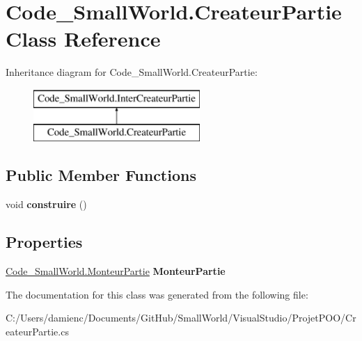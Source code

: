 \hypertarget{class_code___small_world_1_1_createur_partie}{\section{Code\-\_\-\-Small\-World.\-Createur\-Partie Class Reference}
\label{class_code___small_world_1_1_createur_partie}
}
Inheritance diagram for Code\-\_\-\-Small\-World.\-Createur\-Partie\-:\begin{figure}[H]
\begin{center}
\leavevmode
\includegraphics[height=2.000000cm]{class_code___small_world_1_1_createur_partie}
\end{center}
\end{figure}
\subsection*{Public Member Functions}
\begin{DoxyCompactItemize}
\item 
\hypertarget{class_code___small_world_1_1_createur_partie_a3836d8cd285e4cc0686d693dd91c18a5}{void {\bfseries construire} ()}\label{class_code___small_world_1_1_createur_partie_a3836d8cd285e4cc0686d693dd91c18a5}

\end{DoxyCompactItemize}
\subsection*{Properties}
\begin{DoxyCompactItemize}
\item 
\hypertarget{class_code___small_world_1_1_createur_partie_a3d566654338c6f3d15b65cc128424f88}{\hyperlink{class_code___small_world_1_1_monteur_partie}{Code\-\_\-\-Small\-World.\-Monteur\-Partie} {\bfseries Monteur\-Partie}}\label{class_code___small_world_1_1_createur_partie_a3d566654338c6f3d15b65cc128424f88}

\end{DoxyCompactItemize}


The documentation for this class was generated from the following file\-:\begin{DoxyCompactItemize}
\item 
C\-:/\-Users/damienc/\-Documents/\-Git\-Hub/\-Small\-World/\-Visual\-Studio/\-Projet\-P\-O\-O/Createur\-Partie.\-cs\end{DoxyCompactItemize}
